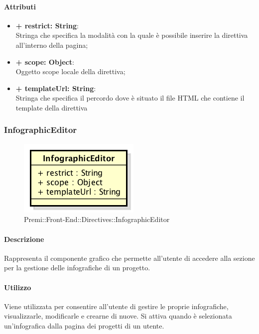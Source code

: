 	\paragraph{Attributi}
	\begin{itemize}
		\item \textbf{+ restrict: String}:\\
			Stringa che specifica la modalità con la quale è possibile inserire la direttiva all'interno della pagina;
		\item \textbf{+ scope: Object}:\\
			Oggetto scope locale della direttiva;
		\item \textbf{+ templateUrl: String}:\\
			Stringa che specifica il percordo dove è situato il file HTML che contiene il template della direttiva
	\end{itemize}
\newpage
	
	
\subsubsection{InfographicEditor}
	\begin{figure}[h]
		\centering
		\includegraphics[width=0.5\linewidth]{img/premi_front_end_directives_infographiceditor}
		\caption[Premi::Front-End::Directives::InfographicEditor]{Premi::Front-End::Directives::InfographicEditor}
	\end{figure}
	
	\paragraph{Descrizione}
		Rappresenta il componente grafico che permette all'utente di accedere alla sezione per la gestione delle infografiche di un progetto.
	
	\paragraph{Utilizzo}
	Viene utilizzata per consentire all'utente di gestire le proprie infografiche, visualizzarle, modificarle e crearne di nuove. Si attiva quando è selezionata un'infografica dalla pagina dei progetti di un utente.
	
